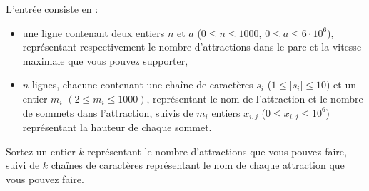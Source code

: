 \begin{Input}
    L'entrée consiste en :
    \begin{itemize}
        \item une ligne contenant deux entiers $n$ et $a$ ($0 \leq n \leq 1000$, $0 \leq a \leq 6 \cdot 10^6$), représentant respectivement le nombre d'attractions dans le parc et la vitesse maximale que vous pouvez supporter,
        \item $n$ lignes, chacune contenant une chaîne de caractères $s_i$ ($1 \leq |s_i| \leq 10$) et un entier $m_i$ $(2 \leq m_i \leq 1000)$, représentant le nom de l'attraction et le nombre de sommets dans l'attraction, suivis de $m_i$ entiers $x_{i,j}$ ($0 \leq x_{i,j} \leq 10^6$) représentant la hauteur de chaque sommet.
    \end{itemize}
\end{Input}

\begin{Output}
    Sortez un entier $k$ représentant le nombre d'attractions que vous pouvez faire, suivi de $k$ chaînes de caractères représentant le nom de chaque attraction que vous pouvez faire.
\end{Output}
